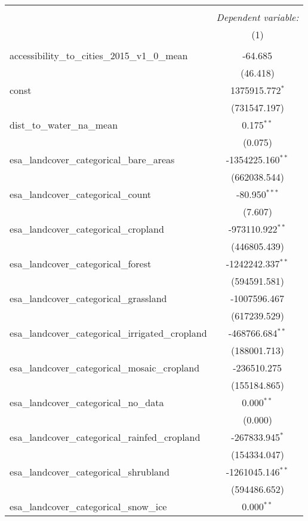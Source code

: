 \begin{table}[!htbp] \centering
\begin{tabular}{@{\extracolsep{5pt}}lc}
\\[-1.8ex]\hline
\hline \\[-1.8ex]
& \multicolumn{1}{c}{\textit{Dependent variable:}} \
\cr \cline{1-2}
\\[-1.8ex] & (1) \\
\hline \\[-1.8ex]
 accessibility_to_cities_2015_v1_0_mean & -64.685$^{}$ \\
  & (46.418) \\
 const & 1375915.772$^{*}$ \\
  & (731547.197) \\
 dist_to_water_na_mean & 0.175$^{**}$ \\
  & (0.075) \\
 esa_landcover_categorical_bare_areas & -1354225.160$^{**}$ \\
  & (662038.544) \\
 esa_landcover_categorical_count & -80.950$^{***}$ \\
  & (7.607) \\
 esa_landcover_categorical_cropland & -973110.922$^{**}$ \\
  & (446805.439) \\
 esa_landcover_categorical_forest & -1242242.337$^{**}$ \\
  & (594591.581) \\
 esa_landcover_categorical_grassland & -1007596.467$^{}$ \\
  & (617239.529) \\
 esa_landcover_categorical_irrigated_cropland & -468766.684$^{**}$ \\
  & (188001.713) \\
 esa_landcover_categorical_mosaic_cropland & -236510.275$^{}$ \\
  & (155184.865) \\
 esa_landcover_categorical_no_data & 0.000$^{**}$ \\
  & (0.000) \\
 esa_landcover_categorical_rainfed_cropland & -267833.945$^{*}$ \\
  & (154334.047) \\
 esa_landcover_categorical_shrubland & -1261045.146$^{**}$ \\
  & (594486.652) \\
 esa_landcover_categorical_snow_ice & 0.000$^{**}$ \\

\end{tabular}
\end{table}
